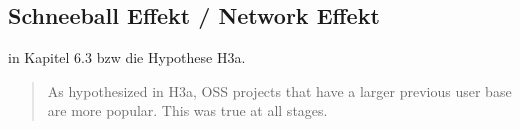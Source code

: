 \subsection{Schneeball Effekt / Network Effekt}



\cite{midhaFactorsAffectingSuccess2012} in Kapitel 6.3 bzw die Hypothese H3a.
\begin{quote}
    \begin{tcolorbox}[colback=black!5!white,colframe=white!75!black,title=Direkt Zitat aus \cite{midhaFactorsAffectingSuccess2012} Kapitel 6.3.]
        As hypothesized in H3a, OSS projects that have a larger previous
        user base are more popular. This was true at all stages.
    \end{tcolorbox}
\end{quote}




